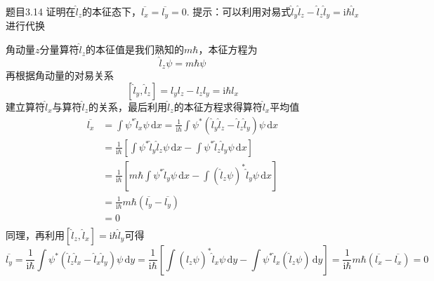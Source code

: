 \begin{question}{题目3.14}
    证明在$\hat{l}_z$的本征态下，$\overline{l_x}=\overline{l_y}=0$.
    \tcblower
    提示：可以利用对易式$\hat{l}_y\hat{l}_z-\hat{l}_z\hat{l}_y=\mathrm{i}\hbar\hat{l}_x$进行代换
\end{question}
\begin{solution}
    角动量$z$分量算符$\hat{l}_z$的本征值是我们熟知的$m\hbar$，本征方程为
    $$
        \hat{l}_z\psi = m\hbar\psi
    $$
    再根据角动量的对易关系
    $$
        \left[\hat{l}_y,\hat{l}_z\right]=l_yl_z-l_zl_y=\mathrm{i}\hbar l_x
    $$
    建立算符$\hat{l}_x$与算符$\hat{l}_z$的关系，最后利用$\hat{l}_z$的本征方程求得算符$\hat{l}_x$平均值
    $$
        \begin{aligned}
            \overline{l_x}
             & =\int\psi^*\hat{l}_x\psi\,\mathrm{d}x=\frac{1}{\mathrm{i}\hbar}\int\psi^*\left(\hat{l}_y\hat{l}_z-\hat{l}_z\hat{l}_y\right)\psi \,\mathrm{d}x \\
             & =\frac{1}{\mathrm{i}\hbar}\left[\int\psi^*\hat{l}_y\hat{l}_z\psi\,\mathrm{d}x-\int\psi^*\hat{l}_z\hat{l}_y\psi \,\mathrm{d}x\right]           \\
             & =\frac{1}{\mathrm{i}\hbar}\left[m\hbar\int\psi^*\hat{l}_y\psi\,\mathrm{d}x-\int\left(\hat{l}_z\psi\right)^*\hat{l}_y\psi \,\mathrm{d}x\right] \\
             & =\frac{1}{\mathrm{i}\hbar}m\hbar\left(\overline{l_y} - \overline{l_y}\right)                                                                  \\
             & =0                                                                                                                                            \\
        \end{aligned}
    $$
    同理，再利用$\left[\hat{l}_z,\hat{l}_x\right]=\mathrm{i}\hbar\hat{l}_y$可得
    $$
        \overline{l_y}
        =\frac{1}{\mathrm{i}\hbar}\int\psi^*(\hat{l}_z\hat{l}_x-\hat{l}_x\hat{l}_y)\psi\,\mathrm{d}y
        =\frac{1}{\mathrm{i}\hbar}\left[\int(\hat{l}_z\psi)^*\hat{l}_x\psi\,\mathrm{d}y-\int\psi^*\hat{l}_x(\hat{l}_z\psi)\,\mathrm{d}y\right]
        =\frac{1}{\mathrm{i}\hbar}m\hbar\left(\overline{l_x}-\overline{l_x}\right)
        =0
    $$
\end{solution}




